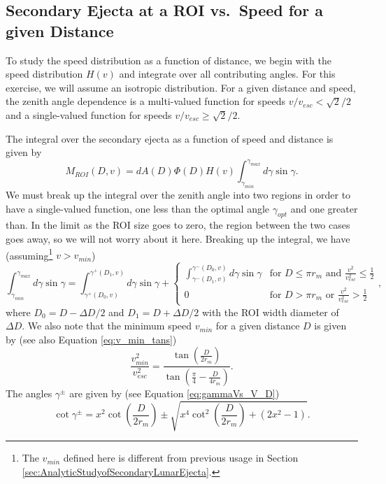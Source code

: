 \documentclass{hitec}
\numberwithin{equation}{section}
\begin{document}
\subsection{Secondary Ejecta at a ROI vs.\ Speed for a given Distance}
To study the speed distribution as a function of distance, we begin with the speed distribution $H(v)$ and integrate over all contributing angles. For this exercise, we will assume an isotropic distribution. For a given distance and speed, the zenith angle dependence is a multi-valued function for speeds $v/v_{esc} < \sqrt{2}/2$ and a single-valued function for speeds $v/v_{esc} \ge \sqrt{2}/2$.

The integral over the secondary ejecta as a function of speed and distance is given by
\begin{equation}
M_{ROI}(D,v) = dA(D)\Phi(D)H(v)\int_{\gamma_{min}}^{\gamma_{max}}d\gamma\sin\gamma.
\end{equation}
We must break up the integral over the zenith angle into two regions in order to have a single-valued function, one less than the optimal angle $\gamma_{opt}$ and one greater than. In the limit as the ROI size goes to zero, the region between the two cases goes away, so we will not worry about it here. Breaking up the integral, we have (assuming\footnote{The $v_{min}$ defined here is different from previous usage in Section \ref{sec:AnalyticStudyofSecondaryLunarEjecta}.} $v>v_{min}$)
\begin{equation}
\int_{\gamma_{min}}^{\gamma_{max}}d\gamma\sin\gamma
= \int_{\gamma^+(D_0,v)}^{\gamma^+(D_1,v)}d\gamma\sin\gamma
+ \begin{cases}
\int_{\gamma^-(D_1,v)}^{\gamma^-(D_0,v)}d\gamma\sin\gamma& \text{for $D \le \pi r_m $ and $\frac{v^2}{v_{esc}^2} \le \frac{1}{2}$}\\
0 &\text{for $D > \pi r_m $ or $\frac{v^2}{v_{esc}^2} > \frac{1}{2}$}
\end{cases},
\end{equation}
where $D_0 = D - \Delta D/2$ and $D_1 = D + \Delta D/2$ with the ROI width diameter of $\Delta D$. We also note that the minimum speed $v_{min}$ for a given distance $D$ is given by (see also Equation \eqref{eq:v_min_tans})
\begin{equation}
\frac{v_{min}^2}{v_{esc}^2} = \frac{\tan\left(\frac{D}{2r_m}\right)}{\tan\left(\frac{\pi}{4}-\frac{D}{4r_m}\right)}.
\end{equation}
The angles $\gamma^{\pm}$ are given by (see Equation \eqref{eq:gammaVs_V_D})
\begin{equation}\label{eq:gammaVs_V_D-repeat}
\cot\gamma^\pm = x^2\cot\left(\frac{D}{2r_m}\right) \pm \sqrt{x^4\cot^2\left(\frac{D}{2r_m}\right) + (2x^2-1)}.
\end{equation}
\end{document}

